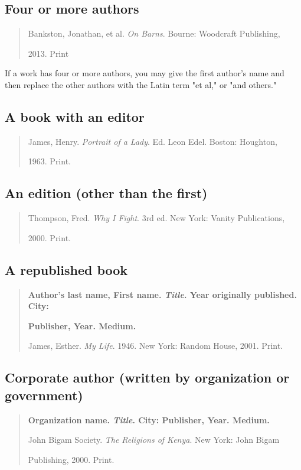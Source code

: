 \subsection{Four or more authors}

\begin{quote}

Bankston, Jonathan, et al. \emph{On Barns}. Bourne: Woodcraft Publishing,

\hspace{.4in}2013. Print

\end{quote}
 If a work has four or more authors, you may give the first author's name and then replace the other authors with the Latin term "et al," or "and others."

\subsection{A book with an editor}
\begin{quote}
James, Henry. \emph{Portrait of a Lady}. Ed. Leon Edel. Boston: Houghton,

\hspace{.4in}1963. Print.
\end{quote}

\subsection{An edition (other than the first)}
\begin{quote}
Thompson, Fred. \emph{Why I Fight}. 3rd ed. New York: Vanity Publications,

\hspace{.4in}2000. Print.
\end{quote}

\subsection{A republished book}
\begin{quote}
\textbf{Author's last name, First name. \emph{Title}. Year originally published. City: }

\hspace{.4in}\textbf{Publisher, Year. Medium.}
\medskip

James, Esther. \emph{My Life}. 1946. New York: Random House, 2001. Print.
\end{quote}

\subsection{Corporate author (written by organization or government)}
\begin{quote}

\textbf{Organization name. \emph{Title}. City: Publisher, Year. Medium.}
\medskip

John Bigam Society. \emph{The Religions of Kenya}. New York: John Bigam 

\hspace{.4in}Publishing, 2000. Print.
\end{quote}

